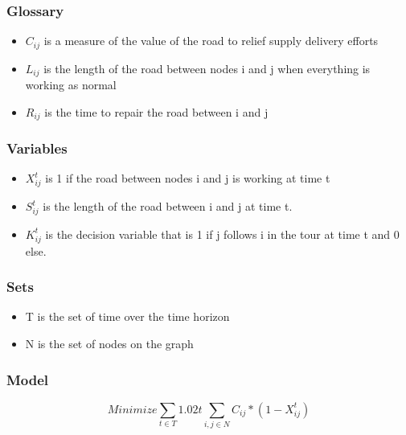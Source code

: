 \documentclass{article}
\begin{document}
	\subsubsection{Glossary}
	\begin{itemize}
		\item $C_{ij}$ is a measure of the value of the road to relief supply delivery efforts
		\item $L_{ij}$ is the length of the road between nodes i and j when everything is working as normal
		\item $R_{ij}$ is the time to repair the road between i and j
	\end{itemize}
	\subsubsection{Variables}
	\begin{itemize}
		\item $X_{ij}^t$ is 1 if the road between nodes i and j is working at time t
		\item $S_{ij}^t$ is the length of the road between i and j at time t. 
		\item $K_{ij}^t$ is the decision variable that is 1 if j follows i in the tour at time t and 0 else.
		
	\end{itemize}
	\subsubsection{Sets}
	\begin{itemize}
		\item T is the set of time over the time horizon
		\item N is the set of nodes on the graph
	\end{itemize}
	\subsubsection{Model}
	$$	Minimize \sum_{t \in T} 1.02t \sum_{i,j \in N} C_{ij}*(1-X_{ij}^t) $$
	
\end{document}
